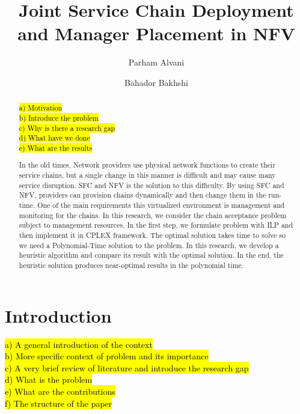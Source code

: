 \documentclass[preprint,review,12pt]{elsarticle}
\newcommand{\hly}[2][yellow]{
  {\sethlcolor{#1} \hl{#2}}
}
\begin{document}
\begin{frontmatter}

\title{Joint Service Chain Deployment and Manager Placement in NFV}

\author[aut]{Parham Alvani}

\author[aut]{Bahador Bakhshi
}


\address[aut]{Amirkabir University of Technology, Tehran, Iran}

\begin{abstract}
\hly{%
a) Motivation \\
b) Introduce the problem \\
c) Why is there a research gap \\
d) What have we done \\
e) What are the results \\
}
In the old times, Network providers use physical network functions to create their service chains, but a single change in this manner is difficult and may cause many service disruption.
SFC and NFV is the solution to this difficulty. By using SFC and NFV, providers can provision chains dynamically and then change them in the run-time.
One of the main requirements this virtualized environment is management and monitoring for the chains.
In this research, we consider the chain acceptance problem subject to management resources. In the first step, we formulate
problem with ILP and then implement it in CPLEX framework. The optimal solution takes time to solve so we need a Polynomial-Time solution to the problem.
In this research, we develop a heuristic algorithm and compare its result with the optimal solution. In the end, the heuristic solution produces near-optimal results in the polynomial time.
\end{abstract}

\begin{keyword}
\end{keyword}

\end{frontmatter}

\section{Introduction}
\hly{%
a) A general introduction of the context \\
b) More specific context of problem and its importance \\
c) A very brief review of literature and introduce the research gap \\
d) What is the problem \\
e) What are the contributions \\
f) The structure of the paper \\
}

\end{document}
